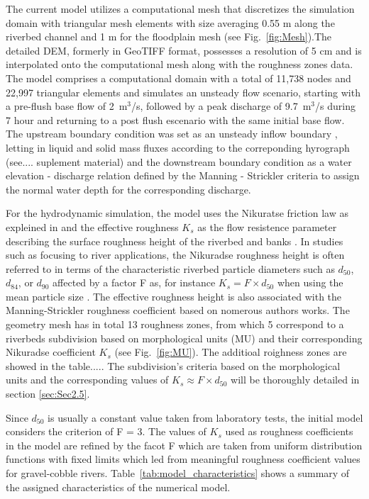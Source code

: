 \documentclass[draft,linenumbers,onecolumn]{agujournal2019} %
\begin{document}
The current model utilizes a computational mesh that discretizes the simulation domain with triangular mesh elements with size averaging 0.55 m along the riverbed channel and 1 m for the floodplain mesh (see Fig.~\ref{fig:Mesh}).The detailed DEM, formerly in GeoTIFF format, possesses a resolution of 5 cm and is interpolated onto the computational mesh along with the roughness zones data. The model comprises a computational domain with a total of 11,738 nodes and 22,997 triangular elements and simulates an unsteady flow scenario, starting with a pre-flush base flow of 2~m$^3$/s, followed by a peak discharge of 9.7~m$^3$/s during 7 hour and returning to a post flush escenario with the same initial base flow. The upstream boundary condition was set as an unsteady inflow boundary , letting in liquid and solid mass fluxes according to the correponding hyrograph (see.... suplement material) and the downstream boundary condition as a water elevation - discharge relation defined by the Manning - Strickler criteria to assign the normal water depth for the corresponding discharge. 

For the hydrodynamic simulation, the model uses the Nikuratse friction law as expleined in \cite{hervouet2020telemac2d} and the effective roughness \(K_{s}\) as the flow resistence parameter describing the surface roughness height of the riverbed and banks \cite{nikuradse1933stroemungsgesetze,marriott2010hydraulic,webber2018fluid}. In studies such as \cite{meyer-peter1948formulas, ferguson2007flow, rickenmann2011evaluation} focusing to river applications, the Nikuradse roughness height is often referred to in terms of the characteristic riverbed particle diameters such as \(d_{50}\), \(d_{84}\), or \(d_{90}\) affected by a factor F as, for instance \( K_{s} = F \times d_{50} \) when using the mean particle size \cite{meyer-peter1948formulas,tassi2023gaia}. The effective roughness height is also associated with the Manning-Strickler roughness coefficient based on nomerous authors works.
The geometry mesh has in total 13 roughness zones, from which 5 correspond to a riverbeds subdivision based on morphological units (MU) and their corresponding Nikuradse coefficient \(K_{s}\) (see Fig.~\ref{fig:MU}). The additioal roighness zones are showed in the table.....  The subdivision's criteria based on the morphological units  and the corresponding values of \( K_{s} \approx F \times d_{50} \) will be thoroughly detailed in section \ref{sec:Sec2.5}.


Since \(d_{50}\) is usually a constant value taken from laboratory tests, the initial model considers the criterion of F = 3. The values of \(K_{s}\) used as roughness coefficients in the model are refined by the facot F which are taken from uniform distribution functions with fixed limits which led from meaningful roughness coefficient values for gravel-cobble rivers. Table~\ref{tab:model_characteristics} shows a summary of the assigned characteristics of the numerical model.
\end{document}
